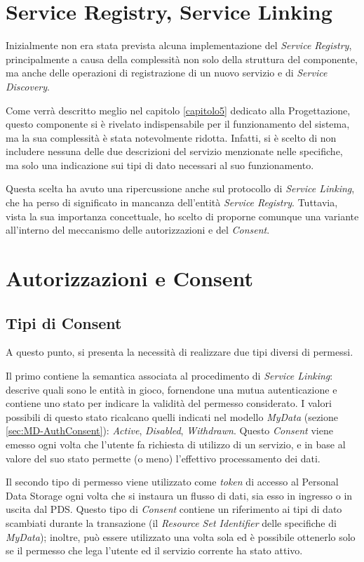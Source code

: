 \section{Service Registry, Service Linking}
Inizialmente non era stata prevista alcuna implementazione del \textit{Service Registry}, principalmente a causa della complessit\`a non solo della struttura del componente, ma anche delle operazioni di registrazione di un nuovo servizio e di \textit{Service Discovery}.

Come verr\`a descritto meglio nel capitolo \ref{capitolo5} dedicato alla Progettazione, questo componente si \`e rivelato indispensabile per il funzionamento del sistema, ma la sua complessit\`a \`e stata notevolmente ridotta. Infatti, si \`e scelto di non includere nessuna delle due descrizioni del servizio menzionate nelle specifiche, ma solo una indicazione sui tipi di dato necessari al suo funzionamento.

Questa scelta ha avuto una ripercussione anche sul protocollo di \textit{Service Linking}, che ha perso di significato in mancanza dell’entit\`a \textit{Service Registry}. Tuttavia, vista la sua importanza concettuale, ho scelto di proporne comunque una variante all’interno del meccanismo delle autorizzazioni e del \textit{Consent}.

\section{Autorizzazioni e Consent}
\subsection{Tipi di Consent}
\label{subsec:A-Consent}
A questo punto, si presenta la necessit\`a di realizzare due tipi diversi di permessi.

Il primo contiene la semantica associata al procedimento di \textit{Service Linking}: descrive quali sono le entit\`a in gioco, fornendone una mutua autenticazione e contiene uno stato per indicare la validit\`a del permesso considerato. I valori possibili di questo stato ricalcano quelli indicati nel modello \textit{MyData} (sezione \ref{sec:MD-AuthConsent}): \textit{Active}, \textit{Disabled}, \textit{Withdrawn}. Questo \textit{Consent} viene emesso ogni volta che l’utente fa richiesta di utilizzo di un servizio, e in base al valore del suo stato permette (o meno) l’effettivo processamento dei dati.

Il secondo tipo di permesso viene utilizzato come \textit{token} di accesso al Personal Data Storage ogni volta che si instaura un flusso di dati, sia esso in ingresso o in uscita dal PDS. Questo tipo di \textit{Consent} contiene un riferimento ai tipi di dato scambiati durante la transazione (il \textit{Resource Set Identifier} delle specifiche di \textit{MyData}); inoltre, pu\`o essere utilizzato una volta sola ed \`e possibile ottenerlo solo se il permesso che lega l’utente ed il servizio corrente ha stato attivo.

